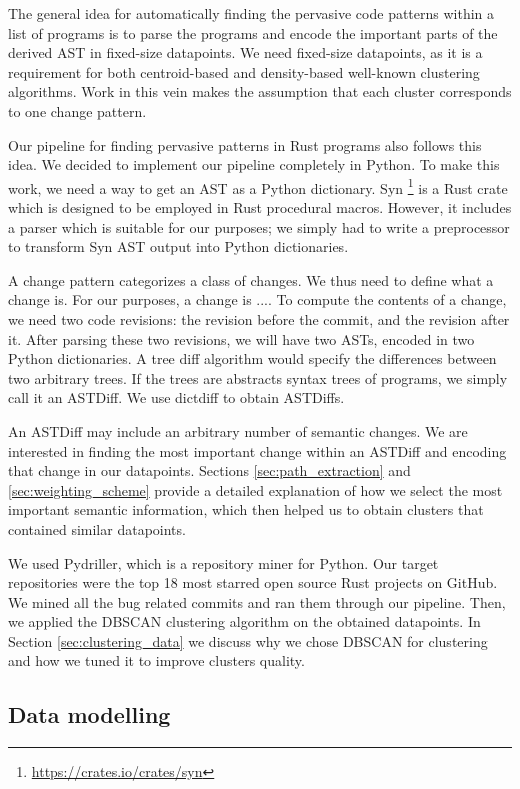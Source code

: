 The general idea for automatically finding the pervasive code patterns within a list of programs is to parse the programs and encode the important parts of the derived AST in fixed-size datapoints. We need fixed-size datapoints, as it is a requirement for both centroid-based and density-based well-known clustering algorithms. Work in this vein makes the assumption that each cluster corresponds to one change pattern.

Our pipeline for finding pervasive patterns in Rust programs also follows this idea. We decided to implement our pipeline completely in Python. To make this work, we need a way to get an AST as a Python dictionary. Syn \footnote{\url{https://crates.io/crates/syn}} is a Rust crate which is designed to be employed in Rust procedural macros. However, it includes a parser which is suitable for our purposes; we simply had to write a preprocessor to transform Syn AST output into Python dictionaries.

A change pattern categorizes a class of changes. We thus need to define what a change is. For our purposes, a change is ....
To compute the contents of a change, we need two code revisions: the revision before the commit, and the revision after it. After parsing these two revisions, we will have two ASTs, encoded in two Python dictionaries. A tree diff algorithm would specify the differences between two arbitrary trees. If the trees are abstracts syntax trees of programs, we simply call it an ASTDiff. We use dictdiff to obtain ASTDiffs.

An ASTDiff may include an arbitrary number of semantic changes. We are interested in finding the most important change within an ASTDiff and encoding that change in our datapoints. Sections \ref{sec:path_extraction} and \ref{sec:weighting_scheme} provide a detailed explanation of how we select the most important semantic information, which then helped us to obtain clusters that contained similar datapoints. 

We used Pydriller, which is a repository miner for Python. Our target repositories were the top 18 most starred open source Rust projects on GitHub. We mined all the bug related commits and ran them through our pipeline. Then, we applied the DBSCAN clustering algorithm on the obtained datapoints. In Section \ref{sec:clustering_data} we discuss why we chose DBSCAN for clustering and how we tuned it to improve clusters quality. 

\subsection{\label{sec:data_modelling}Data modelling}

